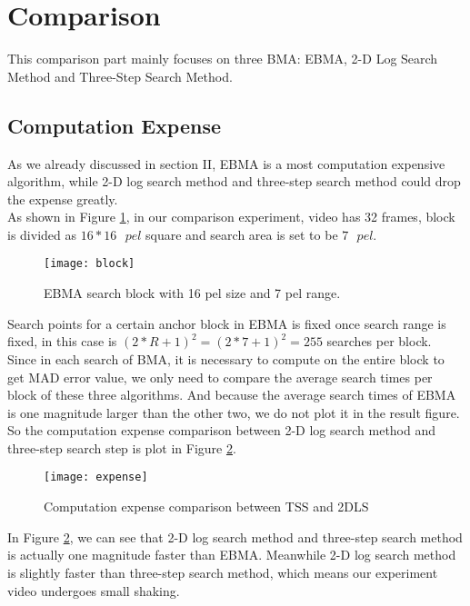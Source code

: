 \documentclass[a4paper, twocolumn]{article}
\begin{document}
	\section{Comparison}
	This comparison part mainly focuses on three BMA: EBMA, 2-D Log Search Method and Three-Step Search Method.
	\subsection{Computation Expense}
	As we already discussed in section II, EBMA is a most computation expensive algorithm, while 2-D log search method and three-step search method could drop the expense greatly. \\
	 As shown in Figure \ref{fig:block}, in our comparison experiment, video has 32 frames, block is divided as $ 16*16 \textit{ } pel $ square and search area is set to be $ 7 \textit{ } pel $.\\
	\begin{figure}[hb]
	\centering
	\texttt{[image: block]}
	\caption{EBMA search block with 16 pel size and 7 pel range.}
	\label{fig:block}
	\end{figure}
	
	\noindent
	Search points for a certain anchor block in EBMA is fixed once search range is fixed, in this case is $ (2*R+1)^2 = (2*7+1)^2=255 $ searches per block.\\
	Since in each search of BMA, it is necessary to compute on the entire block to get MAD error value, we only need to compare the average search times per block of these three algorithms. And because the average search times of EBMA is one magnitude larger than the other two, we do not plot it in the result figure. So the computation expense comparison between 2-D log search method and three-step search step is plot in Figure \ref{fig:expense}.
	\begin{figure}[h]
	\centering
	\texttt{[image: expense]}
	\caption{Computation expense comparison between TSS and 2DLS}
	\label{fig:expense}
	\end{figure}
	
	\noindent
	In Figure \ref{fig:expense}, we can see that 2-D log search method and three-step search method is actually one magnitude faster than EBMA. Meanwhile 2-D log search method is slightly faster than three-step search method, which means our experiment video undergoes small shaking.
	
\end{document}
